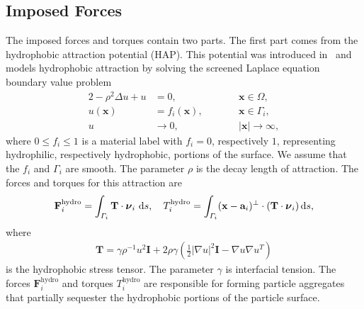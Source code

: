 \documentclass[lineno]{jfm}
\renewcommand{\aa}{\mathbf{a}}
\newcommand{\FF}{\mathbf{F}}
\newcommand{\nnu}{\boldsymbol{\nu}}
\newcommand{\xx}{\mathbf{x}}
\begin{document}
\subsection{Imposed Forces}
The imposed forces and torques contain two parts. The first part comes
from the hydrophobic attraction potential (HAP). This potential was
introduced in~\cite{Fu20} and models hydrophobic attraction by solving
the screened Laplace equation boundary value problem
\begin{alignat}{2}
  \label{eq:SL}
-\rho^2 \Delta u + u &=0,            && \xx \in \Omega,\\
\label{eq:SLbc}
u(\xx) &= f_i(\xx),\qquad  && \xx \in \Gamma_i, \\
\label{eq:SLff}
u &\to 0,                          &&|\xx| \to \infty,
\end{alignat}
where $0 \leq f_i \leq 1$ is a material label with $f_i = 0$, respectively $1$, representing
hydrophilic, respectively hydrophobic, portions of the surface.  We assume that the $f_i$ and $\Gamma_i$ are
smooth.  The parameter $\rho$ is the
decay length of attraction. The forces and torques for this attraction
are 
\begin{align}
  \label{eq:hydrophobicAttraction}
  \FF_i^{\text{hydro}} = \int_{\Gamma_i} {\bf T}\cdot \nnu_i \, \dif s, 
    \quad 
  T_i^{\text{hydro}} = \int_{\Gamma_i} (\xx - \aa_i)^{\perp} \cdot ({\bf T} \cdot \nnu_i) \dif s,
\end{align}
where
\begin{align}
  \label{eq:stress}
\mathbf{T}
= \gamma\rho^{-1}u^2 \mathbf{I} + 2\rho\gamma \left(\tfrac{1}{2}|\nabla
  u|^2 \mathbf{I} - \nabla u  \nabla u^T\right)
\end{align}
is the hydrophobic stress tensor. The parameter $\gamma$ is interfacial
tension. The forces $\FF_i^{\text{hydro}}$ and torques
$T_i^{\text{hydro}}$ are responsible for forming particle aggregates
that partially sequester the hydrophobic portions of the particle
surface.
\end{document}
